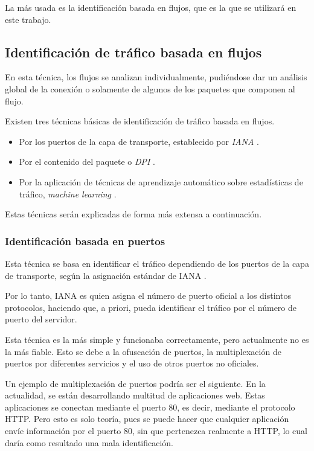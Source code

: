 \intro La más usada es la identificación basada en flujos, que es la que se utilizará en este trabajo.

\subsection{Identificación de tráfico basada en flujos}

En esta técnica, los flujos se analizan individualmente, pudiéndose dar un análisis global de la conexión o solamente de algunos de 
los paquetes que componen al flujo.

\intro Existen tres técnicas básicas de identificación de tráfico basada en flujos.

\begin{itemize}
\item Por los puertos de la capa de transporte, establecido por \textit{IANA} \cite{iana}.
\item Por el contenido del paquete o \textit{DPI} \cite{payload}.
\item Por la aplicación de técnicas de aprendizaje automático sobre estadísticas de tráfico, \textit{machine learning} 
\cite{learning}.
\end{itemize}

\intro Estas técnicas serán explicadas de forma más extensa a continuación.

\subsubsection{Identificación basada en puertos}

Esta técnica se basa en identificar el tráfico dependiendo de los puertos de la capa de transporte, según la asignación estándar 
de IANA \cite{ianaexplicacion}. 

\intro Por lo tanto, IANA es quien asigna el número de puerto oficial a los distintos protocolos, haciendo que, a priori, pueda 
identificar el tráfico por el número de puerto del servidor. 

\intro Esta técnica es la más simple y funcionaba correctamente, pero actualmente no es la más fiable. Esto se debe a la ofuscación de 
puertos, la multiplexación de puertos por diferentes servicios y el uso de otros puertos no oficiales.

\intro Un ejemplo de multiplexación de puertos podría ser el siguiente. En la actualidad, se están desarrollando multitud de 
aplicaciones web. Estas aplicaciones se conectan mediante el puerto 80, es decir, mediante el protocolo HTTP. Pero esto es solo 
teoría, pues se puede hacer que cualquier aplicación envíe información por el puerto 80, sin que pertenezca realmente a HTTP, lo cual 
daría como resultado una mala identificación.

